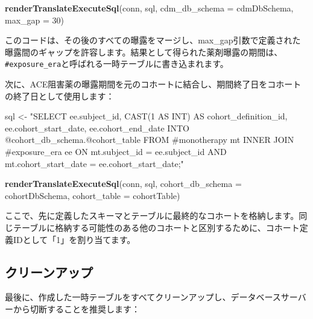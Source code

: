 \documentclass[
  11pt]{book}
\newenvironment{Shaded}{\begin{snugshade}}{\end{snugshade}}
\newcommand{\AttributeTok}[1]{\textcolor[rgb]{0.13,0.29,0.53}{#1}}
\newcommand{\DecValTok}[1]{\textcolor[rgb]{0.00,0.00,0.81}{#1}}
\newcommand{\FunctionTok}[1]{\textcolor[rgb]{0.13,0.29,0.53}{\textbf{#1}}}
\newcommand{\NormalTok}[1]{#1}
\newcommand{\OtherTok}[1]{\textcolor[rgb]{0.56,0.35,0.01}{#1}}
\newcommand{\StringTok}[1]{\textcolor[rgb]{0.31,0.60,0.02}{#1}}
\theoremstyle{definition}
\theoremstyle{definition}
\theoremstyle{definition}
\theoremstyle{definition}
\theoremstyle{remark}
\begin{document}
\begin{Shaded}
\begin{Highlighting}[]
\FunctionTok{renderTranslateExecuteSql}\NormalTok{(conn,}
\NormalTok{                          sql,}
                          \AttributeTok{cdm\_db\_schema =}\NormalTok{ cdmDbSchema,}
                          \AttributeTok{max\_gap =} \DecValTok{30}\NormalTok{)}
\end{Highlighting}
\end{Shaded}

このコードは、その後のすべての曝露をマージし、max\_gap引数で定義された曝露間のギャップを許容します。結果として得られた薬剤曝露の期間は、\texttt{\#exposure\_era}と呼ばれる一時テーブルに書き込まれます。

次に、ACE阻害薬の曝露期間を元のコホートに結合し、期間終了日をコホートの終了日として使用します：

\begin{Shaded}
\begin{Highlighting}[]
\NormalTok{sql }\OtherTok{\textless{}{-}} \StringTok{"SELECT ee.subject\_id,}
\StringTok{  CAST(1 AS INT) AS cohort\_definition\_id,}
\StringTok{  ee.cohort\_start\_date,}
\StringTok{  ee.cohort\_end\_date}
\StringTok{INTO @cohort\_db\_schema.@cohort\_table}
\StringTok{FROM \#monotherapy mt}
\StringTok{INNER JOIN \#exposure\_era ee}
\StringTok{  ON mt.subject\_id = ee.subject\_id}
\StringTok{    AND mt.cohort\_start\_date = ee.cohort\_start\_date;"}

\FunctionTok{renderTranslateExecuteSql}\NormalTok{(conn,}
\NormalTok{                          sql,}
                          \AttributeTok{cohort\_db\_schema =}\NormalTok{ cohortDbSchema,}
                          \AttributeTok{cohort\_table =}\NormalTok{ cohortTable)}
\end{Highlighting}
\end{Shaded}

ここで、先に定義したスキーマとテーブルに最終的なコホートを格納します。同じテーブルに格納する可能性のある他のコホートと区別するために、コホート定義IDとして「1」を割り当てます。

\subsection{クリーンアップ}\label{ux30afux30eaux30fcux30f3ux30a2ux30c3ux30d7-1}

最後に、作成した一時テーブルをすべてクリーンアップし、データベースサーバーから切断することを推奨します：
\end{document}
